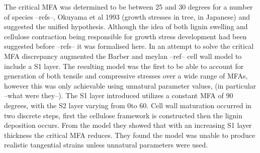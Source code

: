 The critical MFA was determined to be between
25 and 30 degrees for a number of species --refs--, Okuyama et al 1993 (growth
stresses in tree, in Japanese) and \cite{ISI:A1995QJ03000001} suggested the
unified hypothesis. Although the idea of both lignin swelling and cellulose
contraction being responsible for growth stress development had been suggested
before --refs-- it was formalised here. In an attempt to solve the critical MFA
discrepancy \cite{ISI:A1995QJ03000001} augmented the Barber and meylan --ref-- cell wall
model to include a S1 layer. The resulting model was the first to be able to
account for generation of both tensile and compressive stresses over a wide
range of MFAs, however this was only achievable using unnatural parameter values, (in
particular --what were they--). The S1 layer introduced utilizes a constant MFA
of 90 degrees, with the S2 layer varying from 0\celsius to 60\celsius. Cell wall maturation
occurred in two discrete steps, first the cellulose framework is constructed then
the lignin deposition occurs. From the model they showed that with an
increasing S1 layer thickness the critical MFA reduces. They found the model
was unable to produce realistic tangential strains unless unnatural parameters
were used.